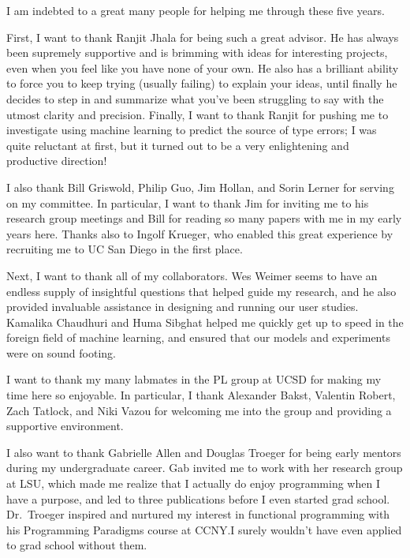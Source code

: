 \begin{acknowledgements}
  I am indebted to a great many people for helping me through these five
  years.

  First, I want to thank Ranjit Jhala for being such a great advisor.
  He has always been supremely supportive and is brimming with ideas for
  interesting projects, even when you feel like you have none of your
  own. He also has a brilliant ability to force you to keep trying
  (usually failing) to explain your ideas, until finally he decides to
  step in and summarize what you've been struggling to say with the
  utmost clarity and precision. Finally, I want to thank Ranjit for
  pushing me to investigate using machine learning to predict the source
  of type errors; I was quite reluctant at first, but it turned out to
  be a very enlightening and productive direction!

  I also thank Bill Griswold, Philip Guo, Jim Hollan, and Sorin Lerner
  for serving on my committee. In particular, I want to thank Jim for
  inviting me to his research group meetings and Bill for reading so
  many papers with me in my early years here. Thanks also to Ingolf
  Krueger, who enabled this great experience by recruiting me to UC
  San Diego in the first place.

  Next, I want to thank all of my collaborators. Wes Weimer seems to
  have an endless supply of insightful questions that helped guide my
  research, and he also provided invaluable assistance in designing and
  running our user studies. Kamalika Chaudhuri and Huma Sibghat helped
  me quickly get up to speed in the foreign field of machine learning,
  and ensured that our models and experiments were on sound footing.

  I want to thank my many labmates in the PL group at UCSD for making my
  time here so enjoyable. In particular, I thank Alexander Bakst,
  Valentin Robert, Zach Tatlock, and Niki Vazou for welcoming me into
  the group and providing a supportive environment.

  I also want to thank Gabrielle Allen and Douglas Troeger for being
  early mentors during my undergraduate career. Gab invited me to work
  with her research group at LSU, which made me realize that I actually
  do enjoy programming when I have a purpose, and led to three
  publications before I even started grad school. Dr.\ Troeger inspired
  and nurtured my interest in functional programming with his
  Programming Paradigms course at CCNY.\@ I surely wouldn't have even
  applied to grad school without them.


\end{acknowledgements}
